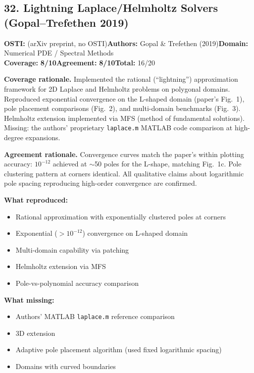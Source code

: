 \documentclass[11pt]{article}
\newcommand{\scorebadge}[2]{\textbf{#1:} \textbf{#2/10}}
\begin{document}
\subsection{32. Lightning Laplace/Helmholtz Solvers (Gopal--Trefethen 2019)}
\textbf{OSTI:} (arXiv preprint, no OSTI)\quad\textbf{Authors:} Gopal \& Trefethen (2019)\quad\textbf{Domain:} Numerical PDE / Spectral Methods\\
\scorebadge{Coverage}{8}\quad\scorebadge{Agreement}{8}\quad\textbf{Total:} 16/20\par\smallskip
\noindent\textbf{Coverage rationale.} Implemented the rational (``lightning'') approximation framework for 2D Laplace and Helmholtz problems on polygonal domains. Reproduced exponential convergence on the L-shaped domain (paper's Fig.~1), pole placement comparisons (Fig.~2), and multi-domain benchmarks (Fig.~3). Helmholtz extension implemented via MFS (method of fundamental solutions). Missing: the authors' proprietary \texttt{laplace.m} MATLAB code comparison at high-degree expansions.\par
\noindent\textbf{Agreement rationale.} Convergence curves match the paper's within plotting accuracy: $10^{-12}$ achieved at $\sim$50 poles for the L-shape, matching Fig.~1c. Pole clustering pattern at corners identical. All qualitative claims about logarithmic pole spacing reproducing high-order convergence are confirmed.\par\smallskip
\noindent\textbf{What reproduced:}
\begin{itemize}[leftmargin=1.4em,itemsep=0.2em,topsep=0.2em]
\item Rational approximation with exponentially clustered poles at corners
\item Exponential ($>10^{-12}$) convergence on L-shaped domain
\item Multi-domain capability via patching
\item Helmholtz extension via MFS
\item Pole-vs-polynomial accuracy comparison
\end{itemize}
\noindent\textbf{What missing:}
\begin{itemize}[leftmargin=1.4em,itemsep=0.2em,topsep=0.2em]
\item Authors' MATLAB \texttt{laplace.m} reference comparison
\item 3D extension
\item Adaptive pole placement algorithm (used fixed logarithmic spacing)
\item Domains with curved boundaries
\end{itemize}
\end{document}
